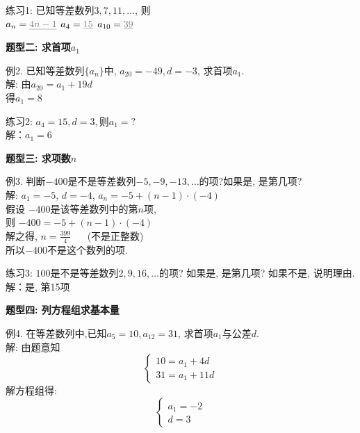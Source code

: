 \documentclass[10pt,a4paper]{article}
\begin{document}
				练习1: 已知等差数列$3, 7, 11, \ldots$, 则\\ 
				$a_n=\textcolor[rgb]{0.5,0.5,0.5}{\underline{4n-1}}$ \hspace{30pt} 
				$a_4=\textcolor[rgb]{0.5,0.5,0.5}{\underline{15}}$ \hspace{30pt} 
				$a_{10}=\textcolor[rgb]{0.5,0.5,0.5}{\underline{39}}$	
	

			\textbf{题型二: 求首项$a_1$}

				例2. 已知等差数列$\{a_n\}$中, $a_{20}=-49, d=-3$, 求首项$a_1$.\\
				\textcolor[rgb]{0.5,0.5,0.5}{解: 由$a_{20}=a_1+19d$ \\  
				得$a_1=8$}
					

				练习2: $a_4=15, d=3, 则a_1=?$\\
				\textcolor[rgb]{0.5,0.5,0.5}{解：$a_1=6$}
	
	

			\textbf{题型三: 求项数$n$}

				例3. 判断$-400$是不是等差数列$-5, -9, -13, \ldots$的项?如果是, 是第几项? \\ 
				\textcolor[rgb]{0.5,0.5,0.5}{解: $a_1=-5$,  $d=-4$,  $a_n=-5+(n-1)\cdot(-4)$\\ 
				假设 $-400$是该等差数列中的第$n$项, \\ 
				则 $-400=-5+(n-1)\cdot(-4)$ \\ 
				解之得, $n=\frac{399}{4} \hspace{20pt}$(不是正整数) \\ 
				所以$-400$不是这个数列的项. }
					

				练习3: $100$是不是等差数列$2, 9, 16, \ldots$的项? 如果是, 是第几项? 如果不是, 说明理由. \\ 
				\textcolor[rgb]{0.5,0.5,0.5}{解：是, 第15项}
	\newpage
	

			\textbf{题型四: 列方程组求基本量}

				例4. 在等差数列中,已知$a_5=10, a_{12}=31$, 求首项$a_1$与公差$d$. \\ 	

				\textcolor[rgb]{0.5,0.5,0.5}{解: 由题意知\\
				\[ \left\{ 
					\begin{array}{l}
						10=a_1+4d\\
						31=a_1+11d
					\end{array}
					\right. \] 	
				解方程组得:\\
				\[ \left\{ 
					\begin{array}{l}
						a_1=-2\\
						d=3
					\end{array}
					\right. \]}
\end{document}
